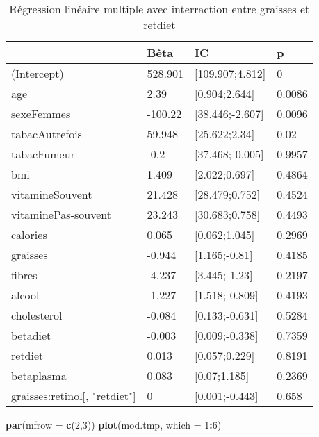 \documentclass[]{article}
\newenvironment{Shaded}{\begin{snugshade}}{\end{snugshade}}
\newcommand{\KeywordTok}[1]{\textcolor[rgb]{0.13,0.29,0.53}{\textbf{#1}}}
\newcommand{\DataTypeTok}[1]{\textcolor[rgb]{0.13,0.29,0.53}{#1}}
\newcommand{\DecValTok}[1]{\textcolor[rgb]{0.00,0.00,0.81}{#1}}
\newcommand{\OperatorTok}[1]{\textcolor[rgb]{0.81,0.36,0.00}{\textbf{#1}}}
\newcommand{\NormalTok}[1]{#1}
\begin{document}
\begin{table}

\caption{\label{tab:unnamed-chunk-75}Régression linéaire multiple avec interraction entre graisses et retdiet}
\centering
\begin{tabular}[t]{l|l|l|l}
\hline
  & Bêta & IC & p\\
\hline
\rowcolor[HTML]{BBD2E1}  (Intercept) & 528.901 & [109.907;4.812] & 0\\
\hline
age & 2.39 & [0.904;2.644] & 0.0086\\
\hline
\rowcolor[HTML]{BBD2E1}  sexeFemmes & -100.22 & [38.446;-2.607] & 0.0096\\
\hline
tabacAutrefois & 59.948 & [25.622;2.34] & 0.02\\
\hline
\rowcolor[HTML]{BBD2E1}  tabacFumeur & -0.2 & [37.468;-0.005] & 0.9957\\
\hline
bmi & 1.409 & [2.022;0.697] & 0.4864\\
\hline
\rowcolor[HTML]{BBD2E1}  vitamineSouvent & 21.428 & [28.479;0.752] & 0.4524\\
\hline
vitaminePas-souvent & 23.243 & [30.683;0.758] & 0.4493\\
\hline
\rowcolor[HTML]{BBD2E1}  calories & 0.065 & [0.062;1.045] & 0.2969\\
\hline
graisses & -0.944 & [1.165;-0.81] & 0.4185\\
\hline
\rowcolor[HTML]{BBD2E1}  fibres & -4.237 & [3.445;-1.23] & 0.2197\\
\hline
alcool & -1.227 & [1.518;-0.809] & 0.4193\\
\hline
\rowcolor[HTML]{BBD2E1}  cholesterol & -0.084 & [0.133;-0.631] & 0.5284\\
\hline
betadiet & -0.003 & [0.009;-0.338] & 0.7359\\
\hline
\rowcolor[HTML]{BBD2E1}  retdiet & 0.013 & [0.057;0.229] & 0.8191\\
\hline
betaplasma & 0.083 & [0.07;1.185] & 0.2369\\
\hline
\rowcolor[HTML]{BBD2E1}  graisses:retinol[, "retdiet"] & 0 & [0.001;-0.443] & 0.658\\
\hline
\end{tabular}
\end{table}

\begin{Shaded}
\begin{Highlighting}[]
\KeywordTok{par}\NormalTok{(}\DataTypeTok{mfrow =} \KeywordTok{c}\NormalTok{(}\DecValTok{2}\NormalTok{,}\DecValTok{3}\NormalTok{))}
\KeywordTok{plot}\NormalTok{(mod.tmp, }\DataTypeTok{which =} \DecValTok{1}\OperatorTok{:}\DecValTok{6}\NormalTok{)}
\end{Highlighting}
\end{Shaded}
\end{document}
